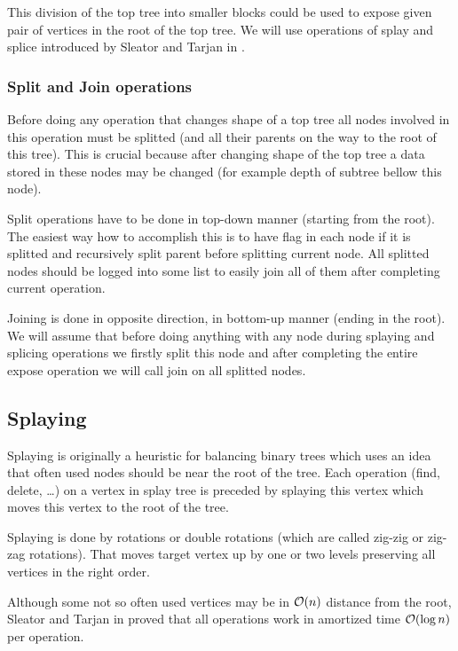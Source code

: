 This division of the top tree into smaller blocks could be used to expose given
pair of vertices in the root of the top tree. We will use operations of
{\I splay} and {\I splice} introduced by Sleator and Tarjan in
\cite{SelfAdjustingBST}.

\subsubsection{Split and Join operations}

Before doing any operation that changes shape of a top tree all nodes involved
in this operation must be splitted (and all their parents on the way to the root
of this tree). This is crucial because after changing shape of the top tree
a data stored in these nodes may be changed (for example depth of subtree bellow
this node).

Split operations have to be done in top-down manner (starting from the root). The
easiest way how to accomplish this is to have flag in each node if it is
splitted and recursively split parent before splitting current node. All
splitted nodes should be logged into some list to easily join all of them after
completing current operation.

Joining is done in opposite direction, in bottom-up manner (ending in the root).
We will assume that before doing anything with any node during splaying and
splicing operations we firstly split this node and after completing the entire
expose operation we will call join on all splitted nodes.

\subsection{Splaying}

Splaying is originally a heuristic for balancing binary trees which uses an idea
that often used nodes should be near the root of the tree. Each operation (find,
delete, \dots) on a vertex in splay tree is preceded by splaying this vertex
which moves this vertex to the root of the tree.

Splaying is done by rotations or double rotations (which are called {\I zig-zig}
or {\I zig-zag} rotations). That moves target vertex up by one or two levels
preserving all vertices in the right order.

Although some not so often used vertices may be in ${\cal O}(n)$ distance from the
root, Sleator and Tarjan in \cite{SelfAdjustingBST} proved that all operations
work in amortized time ${\cal O}(\log n)$ per operation.


